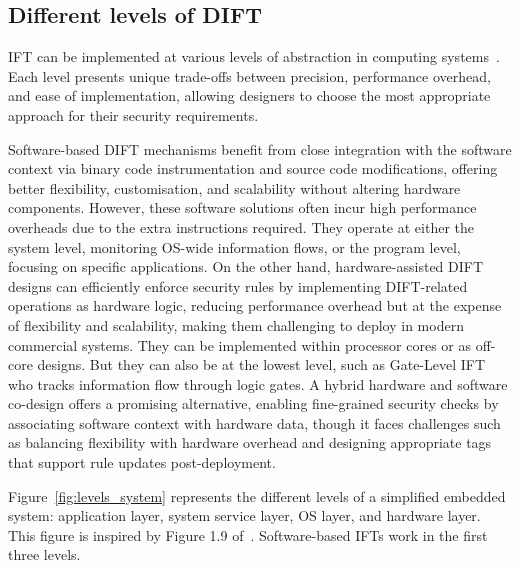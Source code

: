 \subsection{Different levels of DIFT}
IFT can be implemented at various levels of abstraction in computing systems~\cite{HAK-21-acmcsur, BSMCVEJCO-21-acmcsur,CGDJ-21-micromac}. Each level presents unique trade-offs between precision, performance overhead, and ease of implementation, allowing designers to choose the most appropriate approach for their security requirements.

Software-based DIFT mechanisms benefit from close integration with the software context via binary code instrumentation and source code modifications, offering better flexibility, customisation, and scalability without altering hardware components. However, these software solutions often incur high performance overheads due to the extra instructions required. They operate at either the system level, monitoring OS-wide information flows, or the program level, focusing on specific applications.
On the other hand, hardware-assisted DIFT designs can efficiently enforce security rules by implementing DIFT-related operations as hardware logic, reducing performance overhead but at the expense of flexibility and scalability, making them challenging to deploy in modern commercial systems. They can be implemented within processor cores or as off-core designs. But they can also be at the lowest level, such as Gate-Level IFT who tracks information flow through logic gates.
A hybrid hardware and software co-design offers a promising alternative, enabling fine-grained security checks by associating software context with hardware data, though it faces challenges such as balancing flexibility with hardware overhead and designing appropriate tags that support rule updates post-deployment.

Figure~\ref{fig:levels_system} represents the different levels of a simplified embedded system: application layer, system service layer, OS layer, and hardware layer. This figure is inspired by Figure 1.9 of~\cite{ebrary}. Software-based IFTs work in the first three levels.

